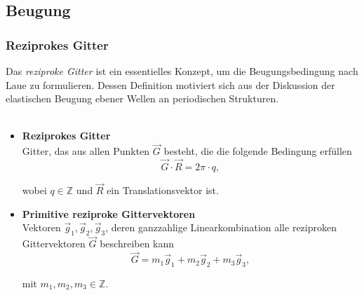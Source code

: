 \documentclass{article}
\begin{document}
\newpage


\subsection{Beugung}
\subsubsection{Reziprokes Gitter}
Das \textit{reziproke Gitter} ist ein essentielles Konzept, um die Beugungsbedingung nach Laue zu formulieren. Dessen Definition motiviert sich aus der Diskussion der elastischen Beugung ebener Wellen an periodischen Strukturen.\\
\\
	\begin{itemize}
		\item \textbf{Reziprokes Gitter}\\
		Gitter, das aus allen Punkten $\vec{G}$ besteht, die die folgende Bedingung erfüllen
			\begin{equation}
				\vec{G} \cdot \vec{R} = 2\pi \cdot q,
			\end{equation}
		
		wobei $q \in \mathbb{Z}$ und $\vec{R}$ ein Translationsvektor ist.


		\item \textbf{Primitive reziproke Gittervektoren}\\
		Vektoren $\vec{g}_1, \vec{g}_2, \vec{g}_3$, deren ganzzahlige Linearkombination alle reziproken Gittervektoren $\vec{G}$ beschreiben kann
			\begin{equation}
				\vec{G} = m_1 \vec{g}_1 + m_2 \vec{g}_2 + m_3 \vec{g}_3,
			\end{equation}
		
		mit $m_1, m_2, m_3 \in \mathbb{Z}$.
	\end{itemize}
\end{document}
